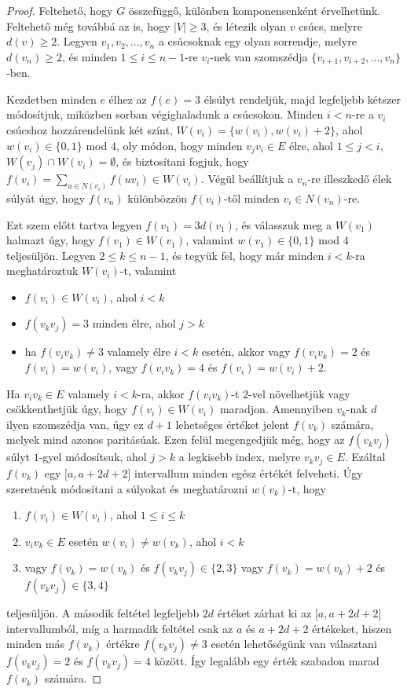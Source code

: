 \documentclass[12pt, a4paper]{report}
\theoremstyle{remark}
\theoremstyle{definition}
\begin{document}
\begin{proof}
Feltehető, hogy $G$ összefüggő, különben komponensenként érvelhetünk. Feltehető még továbbá az is, hogy $|V| \geq 3$, és létezik olyan $v$ csúcs, melyre $d(v) \geq 2$. Legyen $v_1, v_2, \ldots, v_n$ a csúcsoknak egy olyan sorrendje, melyre $d(v_n) \geq 2$, és minden $1 \leq i \leq n-1$-re $v_i$-nek van szomszédja $\lbrace v_{i+1}, v_{i+2}, \ldots, v_n \rbrace$-ben.

Kezdetben minden $e$ élhez az $f(e) = 3$ élsúlyt rendeljük, majd legfeljebb kétszer módosítjuk, miközben sorban végighaladunk a csúcsokon. Minden $i < n$-re a $v_i$ csúcshoz hozzárendelünk két színt, $W(v_i) = \lbrace w(v_i), w(v_i) +2 \rbrace$, ahol $w(v_i) \in \lbrace 0, 1 \rbrace$ mod $4$, oly módon, hogy minden $v_j v_i \in E$ élre, ahol $1 \leq j < i$, $W(v_j) \cap W(v_i) = \emptyset$, és biztosítani fogjuk, hogy $f(v_i) = \sum\limits_{u \in N(v_i)} f(uv_i) \in W(v_i)$. Végül beállítjuk a $v_n$-re illeszkedő élek súlyát úgy, hogy $f(v_n)$ különbözzön $f(v_i)$-től minden $v_i \in N(v_n)$-re.

Ezt szem előtt tartva legyen $f(v_1) = 3d(v_1)$, és válasszuk meg a $W(v_1)$ halmazt úgy, hogy $f(v_1) \in W(v_1)$, valamint $w(v_1) \in \lbrace 0, 1 \rbrace$ mod $4$ teljesüljön. Legyen $2 \leq k \leq n - 1$, és tegyük fel, hogy már minden $i < k$-ra meghatároztuk $W(v_i)$-t, valamint
\begin{itemize}
\item $f(v_i) \in W(v_i)$, ahol $i < k$
\item $f(v_k v_j) = 3$ minden élre, ahol $j > k$
\item ha $f(v_i v_k) \neq 3$ valamely élre $i < k$ esetén, akkor vagy $f(v_i v_k) = 2$ és $f(v_i) = w(v_i)$, vagy $f(v_i v_k) = 4$ és $f(v_i) = w(v_i) + 2$.
\end{itemize}

Ha $v_i v_k \in E$ valamely $i < k$-ra, akkor $f(v_i v_k)$-t $2$-vel növelhetjük vagy csökkenthetjük úgy, hogy $f(v_i) \in W(v_i)$ maradjon. Amennyiben $v_k$-nak $d$ ilyen szomszédja van, úgy ez $d + 1$ lehetséges értéket jelent $f(v_k)$ számára, melyek mind azonos paritásúak. Ezen felül megengedjük még, hogy az $f(v_k v_j)$ súlyt $1$-gyel módosítsuk, ahol $j > k$ a legkisebb index, melyre $v_k v_j \in E$. Ezáltal $f(v_k)$ egy $\lbrack a, a + 2d + 2 \rbrack$ intervallum minden egész értékét felveheti. Úgy szeretnénk módosítani a súlyokat és meghatározni $w(v_k)$-t, hogy
\begin{enumerate}
\item $f(v_i) \in W(v_i)$, ahol $1 \leq i \leq k$
\item $v_i v_k \in E$ esetén $w(v_i) \neq w(v_k)$, ahol $i < k$
\item vagy $f(v_k) = w(v_k)$ és $f(v_k v_j) \in \lbrace 2, 3 \rbrace$ vagy $f(v_k) = w(v_k) + 2$ és $f(v_k v_j) \in \lbrace 3, 4 \rbrace$
\end{enumerate}
teljesüljön. A második feltétel legfeljebb $2d$ értéket zárhat ki az $\lbrack a, a + 2d + 2 \rbrack$ intervallumból, míg a harmadik feltétel csak az $a$ és $a + 2d + 2$ értékeket, hiszen minden más $f(v_k)$ értékre $f(v_k v_j) \neq 3$ esetén lehetőségünk van választani $f(v_k v_j) = 2$ és $f(v_k v_j) = 4$ között. Így legalább egy érték szabadon marad $f(v_k)$ számára.


\end{proof}
\end{document}
